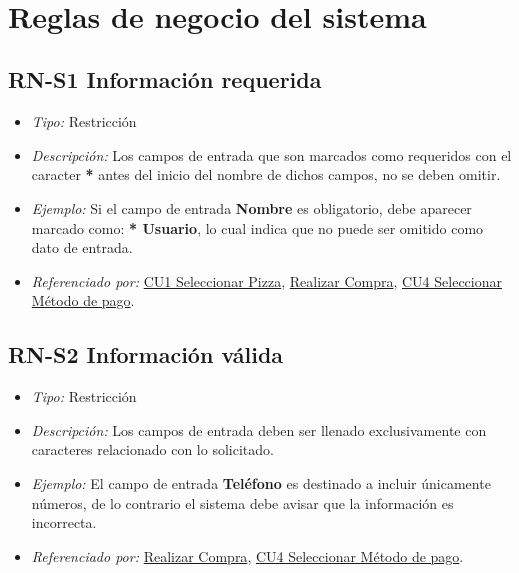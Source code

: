 
\
\section{Reglas de negocio del sistema}

	\hypertarget{RN:S1:InfoRequerida}{}
	\subsection{RN-S1 Información requerida}
		
		\begin{itemize}

			\item \textit{Tipo:} Restricción

			\item \textit{Descripción:} Los campos de entrada que son marcados como requeridos con el caracter \textbf{*} antes del inicio del nombre de dichos campos, no se deben omitir.

			\item \textit{Ejemplo:} Si el campo de entrada \textbf{Nombre} es obligatorio, debe aparecer marcado como: \textbf{* Usuario}, lo cual indica que no puede ser omitido como dato de entrada.

			\item \textit{Referenciado por:} \hyperlink{CU1}{CU1 Seleccionar Pizza}, \hyperlink{CU3}{Realizar Compra}, \hyperlink{CU4}{CU4 Seleccionar Método de pago}.

		\end{itemize}
	
	\hypertarget{RN:S2:InfoValida}{}
	\subsection{RN-S2 Información válida}
	
		\begin{itemize}
		
		\item \textit{Tipo:} Restricción
		
		\item \textit{Descripción:} Los campos de entrada deben ser llenado exclusivamente con caracteres relacionado con lo solicitado.
		
		\item \textit{Ejemplo:} El campo de entrada \textbf{Teléfono} es destinado a incluir únicamente números, de lo contrario el sistema debe avisar que la información es incorrecta.
		
		\item \textit{Referenciado por:} \hyperlink{CU3}{Realizar Compra}, \hyperlink{CU4}{CU4 Seleccionar Método de pago}.
		
		
	\end{itemize}

